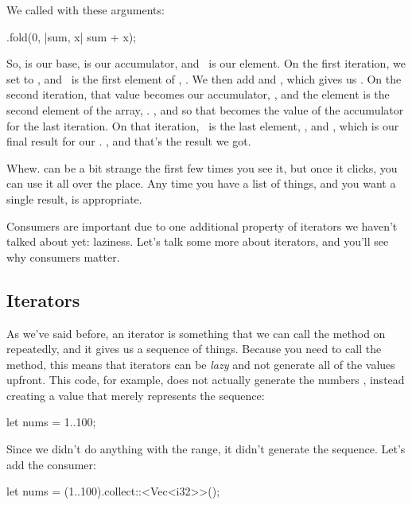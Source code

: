 We called  with these arguments:

\begin{rustc}
.fold(0, |sum, x| sum + x);
\end{rustc}

So,  is our base,  is our accumulator, and \x\ is our element. On the first iteration, we set  to , 
and \x\ is the first element of , . We then add  and \x, which gives us . On the second 
iteration, that value becomes our accumulator, , and the element is the second element of the array, . , 
and so that becomes the value of the accumulator for the last iteration. On that iteration, \x\ is the last element, , and 
, which is our final result for our . , and that's the result we got.

\blank

Whew.  can be a bit strange the first few times you see it, but once it clicks, you can use it all over the place. 
Any time you have a list of things, and you want a single result,  is appropriate.

\blank

Consumers are important due to one additional property of iterators we haven't talked about yet: laziness. Let's talk some more 
about iterators, and you'll see why consumers matter.

\subsection*{Iterators}

As we've said before, an iterator is something that we can call the  method on repeatedly, and it gives us a sequence 
of things. Because you need to call the method, this means that iterators can be \emph{lazy} and not generate all of the values upfront. 
This code, for example, does not actually generate the numbers , instead creating a value that merely represents the sequence:

\begin{rustc}
let nums = 1..100;
\end{rustc}

Since we didn't do anything with the range, it didn't generate the sequence. Let's add the consumer:

\begin{rustc}
let nums = (1..100).collect::<Vec<i32>>();
\end{rustc}

